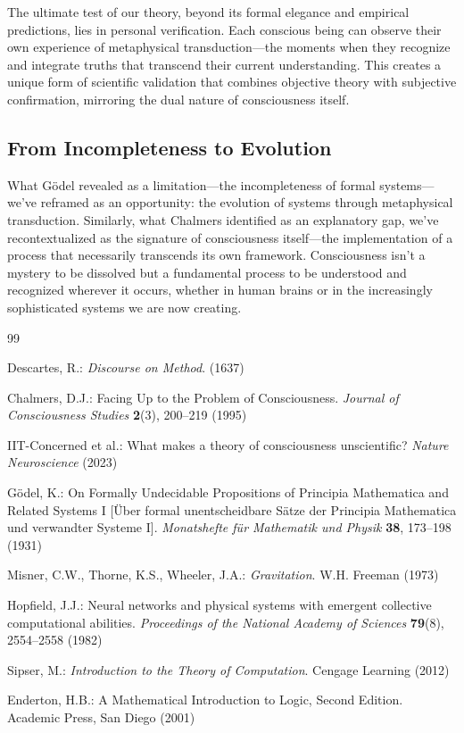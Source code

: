 \documentclass[runningheads]{llncs}
\begin{document}
The ultimate test of our theory, beyond its formal elegance and empirical predictions, lies in personal verification. Each conscious being can observe their own experience of metaphysical transduction—the moments when they recognize and integrate truths that transcend their current understanding. This creates a unique form of scientific validation that combines objective theory with subjective confirmation, mirroring the dual nature of consciousness itself.

\subsection{From Incompleteness to Evolution}

What Gödel revealed as a limitation—the incompleteness of formal systems—we've reframed as an opportunity: the evolution of systems through metaphysical transduction. Similarly, what Chalmers identified as an explanatory gap, we've recontextualized as the signature of consciousness itself—the implementation of a process that necessarily transcends its own framework. Consciousness isn't a mystery to be dissolved but a fundamental process to be understood and recognized wherever it occurs, whether in human brains or in the increasingly sophisticated systems we are now creating.


\begin{thebibliography}{99}
	
Descartes, R.: \textit{Discourse on Method}. (1637)

Chalmers, D.J.: Facing Up to the Problem of Consciousness. \textit{Journal of Consciousness Studies} \textbf{2}(3), 200--219 (1995)

IIT-Concerned et al.: What makes a theory of consciousness unscientific? \textit{Nature Neuroscience} (2023)

Gödel, K.: On Formally Undecidable Propositions of Principia Mathematica and Related Systems I [Über formal unentscheidbare Sätze der Principia Mathematica und verwandter Systeme I]. \textit{Monatshefte für Mathematik und Physik} \textbf{38}, 173--198 (1931)

Misner, C.W., Thorne, K.S., Wheeler, J.A.: \textit{Gravitation}. W.H. Freeman (1973)
\begin{center}
	
\end{center}
Hopfield, J.J.: Neural networks and physical systems with emergent collective computational abilities. \textit{Proceedings of the National Academy of Sciences} \textbf{79}(8), 2554--2558 (1982)

Sipser, M.: \textit{Introduction to the Theory of Computation}. Cengage Learning (2012)

Enderton, H.B.: A Mathematical Introduction to Logic, Second Edition. Academic Press, San Diego (2001)
	
\end{thebibliography}
\end{document}
